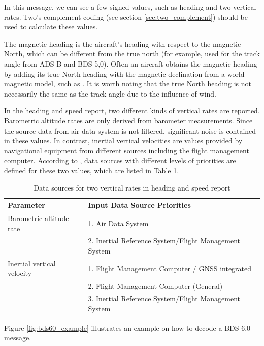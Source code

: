 In this message, we can see a few signed values, such as heading and two vertical rates. Two's complement coding (see section \ref{sec:two_complement}) should be used to calculate these values.

The magnetic heading is the aircraft's heading with respect to the magnetic North, which can be different from the true north (for example, used for the track angle from ADS-B and BDS 5,0). Often an aircraft obtains the magnetic heading by adding its true North heading with the magnetic declination from a world magnetic model, such as \cite{chulliat2015}. It is worth noting that the true North heading is not necessarily the same as the track angle due to the influence of wind.

In the heading and speed report, two different kinds of vertical rates are reported. Barometric altitude rates are only derived from barometer measurements. Since the source data from air data system is not filtered, significant noise is contained in these values. In contrast, inertial vertical velocities are values provided by navigational equipment from different sources including the flight management computer. According to \cite{icao9688}, data sources with different levels of priorities are defined for these two values, which are listed in Table \ref{tb:vertical_rate_source}.

\begin{table}[ht]
\footnotesize
\centering
\caption{Data sources for two vertical rates in heading and speed report}
\label{tb:vertical_rate_source}
\begin{tabular}{|l|l|}
\hline
\textbf{Parameter} & \textbf{Input Data Source Priorities} \\ \hline
Barometric altitude rate & 1. Air Data System\\ 
& 2. Inertial Reference System/Flight Management System \\ \hline
Inertial vertical velocity & 1. Flight Management Computer / GNSS integrated\\ 
& 2. Flight Management Computer (General)\\
& 3. Inertial Reference System/Flight Management System \\ \hline
\end{tabular}
\end{table}


Figure \ref{fig:bds60_example} illustrates an example on how to decode a BDS 6,0 message.

